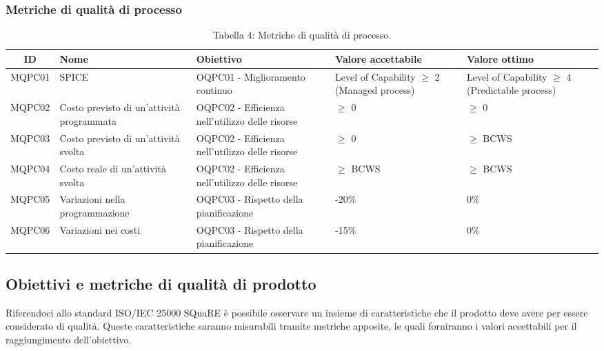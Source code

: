 \subsubsection{Metriche di qualità di processo}
\begin{table}[H]
	\centering
	\begin{tabularx}{\textwidth}{|c|X|X|X|X|}
		\hline
		\textbf{ID} & \textbf{Nome} & \textbf{Obiettivo} & \textbf{Valore accettabile} & \textbf{Valore ottimo}\\
		\hline
		MQPC01 & SPICE & OQPC01 - Miglioramento continuo & Level of Capability $\geq$ 2 (Managed process) & Level of Capability $\geq$ 4 (Predictable process) \\
		\hline
		MQPC02 & Costo previsto di un'attività programmata & OQPC02 - Efficienza nell'utilizzo delle risorse & $\geq$ 0 & $\geq$ 0 \\
		\hline
		MQPC03 & Costo previsto di un'attività svolta & OQPC02 - Efficienza nell'utilizzo delle risorse & $\geq$ 0 & $\geq$ BCWS \\
		\hline
		MQPC04 & Costo reale di un'attività svolta & OQPC02 - Efficienza nell'utilizzo delle risorse & $\geq$ BCWS & $\geq$ BCWS \\
		\hline
		MQPC05 & Variazioni nella programmazione & OQPC03 - Rispetto della pianificazione & -20\% & 0\% \\
		\hline
		MQPC06 & Variazioni nei costi & OQPC03 - Rispetto della pianificazione & -15\% & 0\% \\
		\hline
	\end{tabularx}
	\caption{Tabella 4: Metriche di qualità di processo.}
\end{table}
\subsection{Obiettivi e metriche di qualità di prodotto}
Riferendoci allo standard ISO/IEC 25000 SQuaRE è possibile osservare un insieme di caratteristiche che il prodotto deve avere per essere considerato di qualità. Queste caratteristiche saranno misurabili tramite metriche apposite, le quali forniranno i valori accettabili per il raggiungimento dell'obiettivo.
